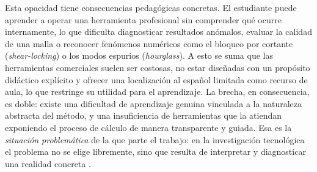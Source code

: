 Esta opacidad tiene consecuencias pedagógicas concretas. El estudiante puede aprender a operar una herramienta profesional sin comprender qué ocurre internamente, lo que dificulta diagnosticar resultados anómalos, evaluar la calidad de una malla o reconocer fenómenos numéricos como el bloqueo por cortante (\emph{shear-locking}) o los modos espurios (\emph{hourglass}). A esto se suma que las herramientas comerciales suelen ser costosas, no estar diseñadas con un propósito didáctico explícito \autocite[p.~1160]{perezsantiago2023fem} y ofrecer una localización al español limitada como recurso de aula, lo que restringe su utilidad para el aprendizaje. La brecha, en consecuencia, es doble: existe una dificultad de aprendizaje genuina vinculada a la naturaleza abstracta del método, y una insuficiencia de herramientas que la atiendan exponiendo el proceso de cálculo de manera transparente y guiada. Esa es la \emph{situación problemática} de la que parte el trabajo: en la investigación tecnológica el problema no se elige libremente, sino que resulta de interpretar y diagnosticar una realidad concreta \autocite[p.~83]{garciacordoba2005tecnologica}.

